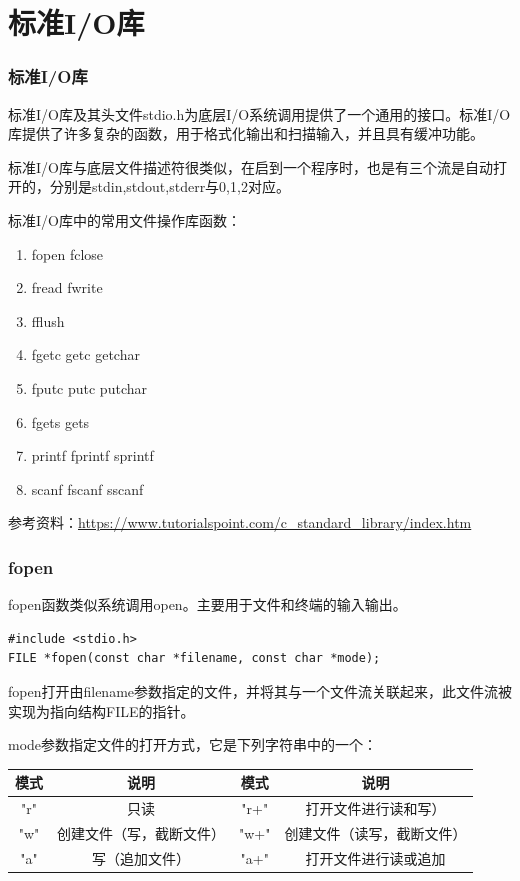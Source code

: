 \documentclass{beamer}
\begin{document}
\section{标准I/O库}
\begin{frame}
\frametitle{标准I/O库}
标准I/O库及其头文件stdio.h为底层I/O系统调用提供了一个通用的接口。标准I/O库提供了许多复杂的函数，用于格式化输出和扫描输入，并且具有缓冲功能。

标准I/O库与底层文件描述符很类似，在启到一个程序时，也是有三个流是自动打开的，分别是stdin,stdout,stderr与0,1,2对应。

标准I/O库中的常用文件操作库函数：
\begin{enumerate}
\item
fopen	fclose
\item
fread		fwrite
\item
fflush
\item
fgetc		getc		getchar
\item
fputc		putc		putchar
\item
fgets		gets
\item
printf		fprintf	sprintf
\item
scanf	fscanf	sscanf
\end{enumerate}
参考资料：\url{https://www.tutorialspoint.com/c_standard_library/index.htm}
\end{frame}
\begin{frame}[fragile]
\frametitle{fopen}
fopen函数类似系统调用open。主要用于文件和终端的输入输出。
\begin{example}[fopen函数原型]
\begin{verbatim}
#include <stdio.h>
FILE *fopen(const char *filename, const char *mode);
\end{verbatim}
\end{example}
fopen打开由filename参数指定的文件，并将其与一个文件流关联起来，此文件流被实现为指向结构FILE的指针。

mode参数指定文件的打开方式，它是下列字符串中的一个：
\begin{table}
\begin{tabular}{cccc}
\toprule
\textbf{模式} & \textbf{说明} & \textbf{模式} & \textbf{说明} \\
\midrule
"r" & 只读 & "r+" & 打开文件进行读和写） \\
"w" & 创建文件（写，截断文件） & "w+"& 创建文件（读写，截断文件） \\
"a" & 写（追加文件） & "a+"& 打开文件进行读或追加 \\
\bottomrule
\end{tabular}
\end{table}
\end{frame}
\end{document}
